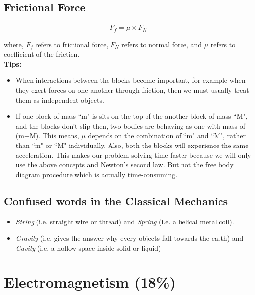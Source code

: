 \documentclass[12pt,a4paper]{article}
\begin{document}
\subsection{Frictional Force}

\begin{align}
F_{f} = \mu \times F_{N}
\end{align}

where, $F_{f}$ refers to frictional force, $F_{N}$ refers to normal force, and $\mu$ refers to coefficient of the friction.
\\
\textbf{Tips:} 
\begin{itemize}

\item When interactions between the blocks become important, for example when they exert forces on one another through friction, then we must usually treat them as independent objects.

\item If one block of mass ``m" is sits on the top of the another block of mass ``M", and the blocks don't slip then, two bodies are behaving as one with mass of (m+M).  This means, $\mu$ depends on the combination of ``m" and ``M", rather than ``m" or ``M" individually. Also, both the blocks will experience the same acceleration. This makes our problem-solving time faster because we will only use the above concepts and Newton's second law. But not the free body diagram procedure which is actually time-consuming.

\end{itemize}

\subsection{Confused words in the Classical Mechanics}

\begin{itemize}
\item \emph{String} (i.e. straight wire or thread) and \emph{Spring} (i.e. a helical metal coil).
\item \emph{Gravity} (i.e. gives the answer why every objects fall towards the earth) and \emph{Cavity} (i.e. a hollow space inside solid or liquid)
\end{itemize}
\section{Electromagnetism (18\%)}
\end{document}
